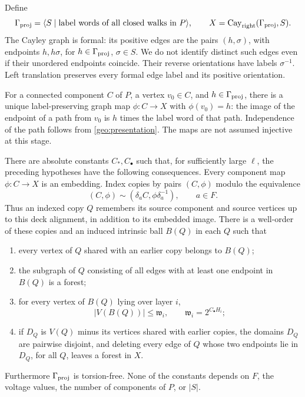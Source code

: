 Define
\begin{equation}
 \Gamma_{\mathrm{proj}}=\langle S\mid \text{label words of all closed walks in }P\rangle,
 \qquad X=\operatorname{Cay}_{\mathrm{right}}(\Gamma_{\mathrm{proj}},S).
 \label{geo:presentation}
\end{equation}
The Cayley graph is formal: its positive edges are the pairs $(h,\sigma)$,
with endpoints $h,h\sigma$, for $h\in\Gamma_{\mathrm{proj}}$, $\sigma\in S$.  We do not
identify distinct such edges even if their unordered endpoints coincide.
Their reverse orientations have labels $\sigma^{-1}$.  Left translation
preserves every formal edge label and its positive orientation.

For a connected component $C$ of $P$, a vertex $v_0\in C$, and $h\in\Gamma_{\mathrm{proj}}$,
there is a unique label-preserving graph map $\phi:C\to X$ with
$\phi(v_0)=h$: the image of the endpoint of a path from $v_0$ is $h$ times
the label word of that path.  Independence of the path follows from
\eqref{geo:presentation}.  The maps are not assumed injective at this stage.

\begin{theorem}
\label{geo:main}
There are absolute constants $C_*,C_\bullet$ such that, for sufficiently
large $\ell$, the preceding hypotheses have the following consequences.
Every component map $\phi:C\to X$ is an embedding.  Index copies by pairs
$(C,\phi)$ modulo the equivalence
\[
 (C,\phi)\sim
 (\delta_a C,\phi\delta_a^{-1}),\qquad a\in F.
\]
Thus an indexed copy $Q$ remembers its source component and source vertices
up to this deck alignment, in addition to its embedded image.
There is a well-order of these copies and an induced intrinsic ball $B(Q)$
in each $Q$ such that
\begin{enumerate}
 \item every vertex of $Q$ shared with an earlier copy belongs to $B(Q)$;
 \item the subgraph of $Q$ consisting of all edges with at least one
 endpoint in $B(Q)$ is a forest;
 \item for every vertex of $B(Q)$ lying over layer $i$,
 \begin{equation}
 |V(B(Q))|\le\mathfrak w_i,
 \qquad \mathfrak w_i=2^{C_\bullet H_i};
 \label{geo:weight}
 \end{equation}
 \item if $D_Q$ is $V(Q)$ minus its vertices shared with earlier copies,
 the domains $D_Q$ are pairwise disjoint, and deleting every edge of $Q$
 whose two endpoints lie in $D_Q$, for all $Q$, leaves a forest in $X$.
\end{enumerate}
Furthermore $\Gamma_{\mathrm{proj}}$ is torsion-free.  None of the constants depends on
$F$, the voltage values, the number of components of $P$, or $|S|$.
\end{theorem}


